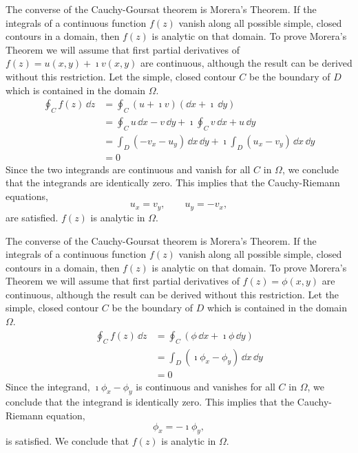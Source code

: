The converse of the Cauchy-Goursat theorem is Morera's Theorem.  
If the integrals of 
a continuous function $f(z)$ vanish along all possible simple, closed contours 
in a domain, then $f(z)$ is analytic on that domain.  To prove Morera's
Theorem we will assume that first partial derivatives of 
$f(z) = u(x, y) + \imath v(x,y)$ are continuous, although the result can be derived
without this restriction.  Let the simple, closed contour $C$ be the boundary
of $D$ which is contained in the domain $\Omega$.
\begin{align*}
  \oint_C f(z) \,\dd z 
  &= \oint_C (u + \imath v) (\dd x + \imath\,\dd y) 
  \\
  &= \oint_C u \,\dd x - v \,\dd y + \imath \oint_C v \,\dd x + u \,\dd y 
  \\
  &= \int_D (-v_x - u_y) \,\dd x\,\dd y + \imath \int_D (u_x - v_y) \,\dd x\,\dd y 
  \\
  &= 0
\end{align*}
Since the two integrands are continuous and vanish for all $C$ in $\Omega$,
we conclude that the integrands are identically zero.  This implies that the 
Cauchy-Riemann equations,
\[
u_x = v_y, \qquad u_y = - v_x,
\]
are satisfied.  $f(z)$ is analytic in $\Omega$.




The converse of the Cauchy-Goursat theorem is Morera's Theorem.  
If the integrals of 
a continuous function $f(z)$ vanish along all possible simple, closed contours 
in a domain, then $f(z)$ is analytic on that domain.  To prove Morera's
Theorem we will assume that first partial derivatives of 
$f(z) = \phi(x, y)$ are continuous, although the result can be derived
without this restriction.  Let the simple, closed contour $C$ be the boundary
of $D$ which is contained in the domain $\Omega$.
\begin{align*}
  \oint_C f(z)\,\dd z 
  &= \oint_C (\phi\,\dd x + \imath \phi\,\dd y) 
  \\
  &= \int_D (\imath \phi_x - \phi_y) \,\dd x\,\dd y
  \\
  &= 0
\end{align*}
Since the integrand, $\imath \phi_x - \phi_y$ is continuous and vanishes for all $C$ in $\Omega$,
we conclude that the integrand is identically zero.  This implies that the 
Cauchy-Riemann equation,
\[
\phi_x = - \imath \phi_y,
\]
is satisfied.  We conclude that $f(z)$ is analytic in $\Omega$.






